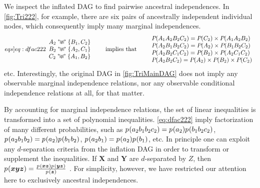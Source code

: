 We inspect the inflated DAG to find pairwise ancestral independences. In \cref{fig:Tri222}, for example, there are six pairs of ancestrally independent individual nodes, which consequently imply many marginal independences.
\begin{align}\begin{split}\label[eqs]{eq:dfac222}
\larray{
A_2\aindep\{B_1,C_2\}\\
B_2\aindep\{A_2,C_1\}\\
C_2\aindep\{A_1,B_2\}
}\qquad\text{implies that}\qquad
\larray{
\pdf{A_1 A_2 B_2 C_2}=\pdf{C_2}\times\pdf{A_1 A_2 B_2}\\
\pdf{A_2 B_1 B_2 C_2}=\pdf{A_2}\times\pdf{B_1 B_2 C_2}\\
\pdf{A_2 B_2 C_1 C_2}=\pdf{B_2}\times\pdf{A_2 C_1 C_2}\\
\pdf{A_2 B_2 C_2}=\pdf{A_2}\times\pdf{B_2}\times\pdf{C_2}\\
}
\end{split}\end{align}
etc.
Interestingly, the original DAG in \cref{fig:TriMainDAG} does not imply any observable marginal independence relations, nor any observable conditional independence relations at all, for that matter. 

By accounting for marginal independence relations, the set of linear inequalities is transformed into a set of polynomial inequalities. \cref{eq:dfac222} imply factorization of many different probabilities, such as ${{p_{}}\lparen a_2 b_1 b_2 c_2\rparen= {p_{}}\lparen a_2\rparen {p_{}}\lparen b_1 b_2 c_2\rparen}$, ${{p_{}}\lparen a_2 b_1 b_2\rparen= {p_{}}\lparen a_2\rparen {p_{}}\lparen b_1 b_2\rparen}$, ${{p_{}}\lparen a_2 b_1\rparen= {p_{}}\lparen a_2\rparen {p_{}}\lparen b_1\rparen}$, etc. In principle one can exploit any $d$-separation criteria from the inflation DAG in order to transform or supplement the inequalities. If $\bm{X}$ and $\bm{Y}$ are $d$-separated by $Z$, then ${p_{}}\lparen\bm{x} \bm{y} \bm{z}\rparen=\frac{{p_{}}\lparen\bm{x}\bm{z}\rparen{p_{}}\lparen\bm{y}\bm{z}\rparen}{{p_{}}\lparen\bm{z}\rparen}$ \cite{pearl2009causality,spirtes2011causation,studeny2005probabilistic,koller2009probabilistic}. For simplicity, however, we have restricted our attention here to exclusively ancestral independences. 



\label{step:findmap}\par\smallskip\nobreak


